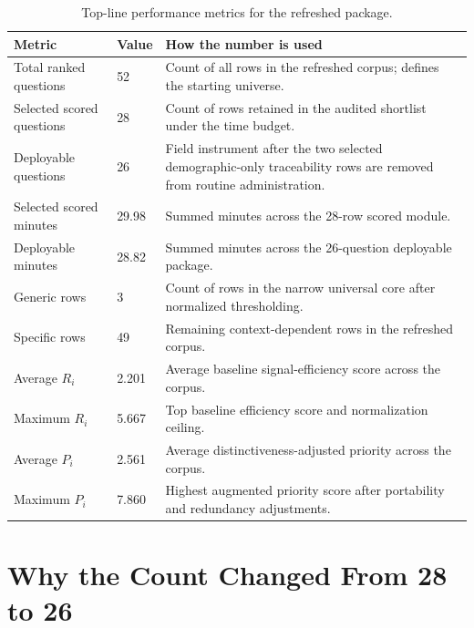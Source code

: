 \documentclass[12pt]{article}
\begin{document}
\begin{table}[H]
\centering
\footnotesize
\begin{tabularx}{\textwidth}{L{0.26\textwidth} R{0.10\textwidth} Y}
\toprule
Metric & Value & How the number is used \\
\midrule
Total ranked questions & 52 & Count of all rows in the refreshed corpus; defines the starting universe. \\
Selected scored questions & 28 & Count of rows retained in the audited shortlist under the time budget. \\
Deployable questions & 26 & Field instrument after the two selected demographic-only traceability rows are removed from routine administration. \\
Selected scored minutes & 29.98 & Summed minutes across the 28-row scored module. \\
Deployable minutes & 28.82 & Summed minutes across the 26-question deployable package. \\
Generic rows & 3 & Count of rows in the narrow universal core after normalized thresholding. \\
Specific rows & 49 & Remaining context-dependent rows in the refreshed corpus. \\
Average $R_i$ & 2.201 & Average baseline signal-efficiency score across the corpus. \\
Maximum $R_i$ & 5.667 & Top baseline efficiency score and normalization ceiling. \\
Average $P_i$ & 2.561 & Average distinctiveness-adjusted priority across the corpus. \\
Maximum $P_i$ & 7.860 & Highest augmented priority score after portability and redundancy adjustments. \\
\bottomrule
\end{tabularx}
\caption{Top-line performance metrics for the refreshed package.}
\end{table}

\section{Why the Count Changed From 28 to 26}
\end{document}
